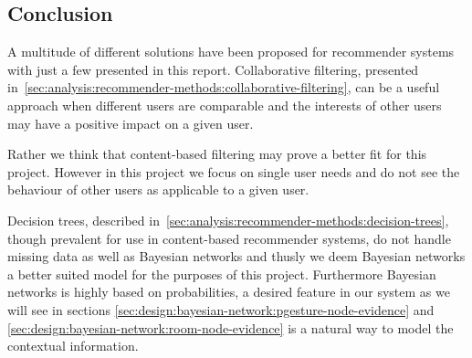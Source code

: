 \subsection{Conclusion}
\label{sec:analysis:recommender-methods:conclusion}

A multitude of different solutions have been proposed for recommender systems~\cite{adomavicius2005toward} with just a few presented in this report.
Collaborative filtering, presented in~\cref{sec:analysis:recommender-methods:collaborative-filtering}, can be a useful approach when different users are comparable and the interests of other users may have a positive impact on a given user.

Rather we think that content-based filtering may prove a better fit for this project.
However in this project we focus on single user needs and do not see the behaviour of other users as applicable to a given user.

Decision trees, described in~\cref{sec:analysis:recommender-methods:decision-trees}, though prevalent for use in content-based recommender systems, do not handle missing data as well as Bayesian networks and thusly we deem Bayesian networks a better suited model for the purposes of this project. Furthermore Bayesian networks is highly based on probabilities, a desired feature in our system as we will see in sections \ref{sec:design:bayesian-network:pgesture-node-evidence} and \ref{sec:design:bayesian-network:room-node-evidence} is a natural way to model the contextual information.

